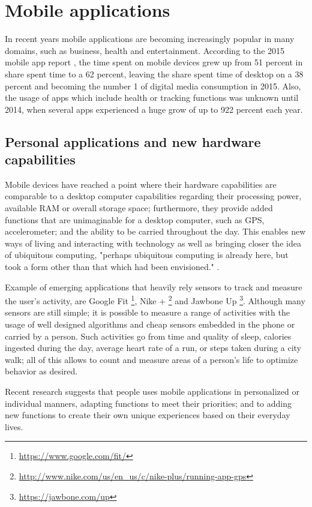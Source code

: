 \section{Mobile applications}
In recent years mobile applications are becoming increasingly popular in many domains, such as business, health and entertainment. According to the 2015 mobile app report \cite{ComScore}, the time spent on mobile devices grew up from 51 percent in share spent time to a 62 percent, leaving the share spent time of desktop on a 38 percent and becoming the number 1 of digital media consumption in 2015. Also, the usage of apps which include health or tracking functions was unknown until 2014, when several apps experienced a huge grow of up to 922 percent each year. 

\subsection{Personal applications and new hardware capabilities}

Mobile devices have reached a point where their hardware capabilities are comparable to a desktop computer capabilities regarding their processing power, available RAM or overall storage space; furthermore, they provide added functions that are unimaginable for a desktop computer, such as GPS, accelerometer; and the ability to be carried throughout the day. This enables new ways of living and interacting with technology as well as bringing closer the idea of ubiquitous computing, "perhaps ubiquitous computing is already here, but took a form other than that which had been envisioned." \cite{Bell2007}. 

Example of emerging applications that heavily rely sensors to track and measure the user's activity, are Google Fit \footnote{\url{https://www.google.com/fit/}}, Nike + \footnote{\url{http://www.nike.com/us/en_us/c/nike-plus/running-app-gps}} and Jawbone Up \footnote{\url{https://jawbone.com/up}}. Although many sensors are still simple; it is possible to measure a range of activities with the usage of well designed algorithms and cheap sensors embedded in the phone or carried by a person. Such activities go from time and quality of sleep, calories ingested during the day, average heart rate of a run, or steps taken during a city walk; all of this allows to count and measure areas of a person's life to optimize behavior as desired.

Recent research \cite{Barkhuus2011} suggests that people uses mobile applications in personalized or individual manners, adapting functions to meet their priorities; and to adding  new functions to create their own unique experiences based on their everyday lives. 


